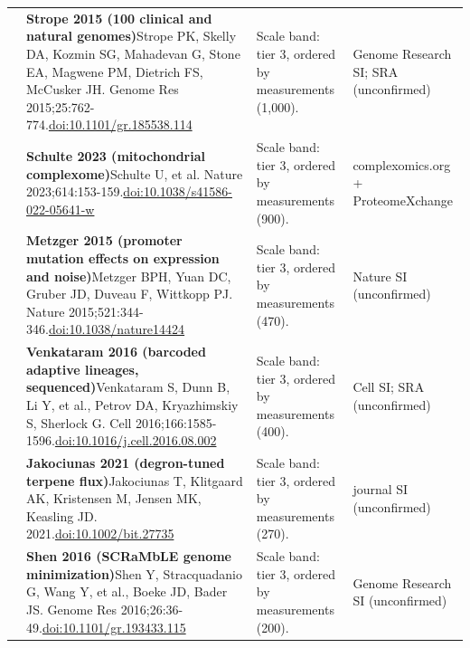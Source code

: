 \begin{landscape}
\begin{longtable}{@{}r@{\hspace{4pt}} L{86mm} L{92mm} L{62mm}@{}}
 & \textbf{Strope 2015 (100 clinical and natural genomes)}\newline Strope PK, Skelly DA, Kozmin SG, Mahadevan G, Stone EA, Magwene PM, Dietrich FS, McCusker JH. Genome Res 2015;25:762-774.\newline \href{https://doi.org/10.1101/gr.185538.114}{doi:10.1101/\allowbreak gr.185538.114} & Scale band: tier 3, ordered by measurements (1,000). & Genome Research SI; SRA (unconfirmed) \\
 & \textbf{Schulte 2023 (mitochondrial complexome)}\newline Schulte U, et al. Nature 2023;614:153-159.\newline \href{https://doi.org/10.1038/s41586-022-05641-w}{doi:10.1038/\allowbreak s41586-022-05641-w} & Scale band: tier 3, ordered by measurements (900). & complexomics.org + ProteomeXchange \\
 & \textbf{Metzger 2015 (promoter mutation effects on expression and noise)}\newline Metzger BPH, Yuan DC, Gruber JD, Duveau F, Wittkopp PJ. Nature 2015;521:344-346.\newline \href{https://doi.org/10.1038/nature14424}{doi:10.1038/\allowbreak nature14424} & Scale band: tier 3, ordered by measurements (470). & Nature SI (unconfirmed) \\
 & \textbf{Venkataram 2016 (barcoded adaptive lineages, sequenced)}\newline Venkataram S, Dunn B, Li Y, et al., Petrov DA, Kryazhimskiy S, Sherlock G. Cell 2016;166:1585-1596.\newline \href{https://doi.org/10.1016/j.cell.2016.08.002}{doi:10.1016/\allowbreak j.cell.2016.08.002} & Scale band: tier 3, ordered by measurements (400). & Cell SI; SRA (unconfirmed) \\
 & \textbf{Jakociunas 2021 (degron-tuned terpene flux)}\newline Jakociunas T, Klitgaard AK, Kristensen M, Jensen MK, Keasling JD. 2021.\newline \href{https://doi.org/10.1002/bit.27735}{doi:10.1002/\allowbreak bit.27735} & Scale band: tier 3, ordered by measurements (270). & journal SI (unconfirmed) \\
 & \textbf{Shen 2016 (SCRaMbLE genome minimization)}\newline Shen Y, Stracquadanio G, Wang Y, et al., Boeke JD, Bader JS. Genome Res 2016;26:36-49.\newline \href{https://doi.org/10.1101/gr.193433.115}{doi:10.1101/\allowbreak gr.193433.115} & Scale band: tier 3, ordered by measurements (200). & Genome Research SI (unconfirmed) \\

\end{longtable}
\end{landscape}
